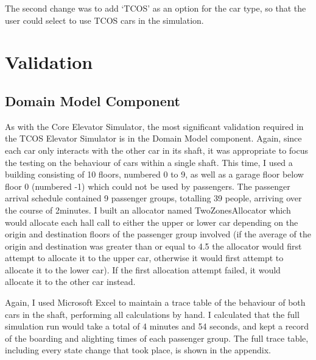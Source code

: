 \documentclass{UoYCSproject}
\begin{document}
The second change was to add `TCOS' as an option for the car type, so that the user could select to use TCOS cars in the simulation.

\section{Validation}

\subsection{Domain Model Component}
As with the Core Elevator Simulator, the most significant validation required in the TCOS Elevator Simulator is in the Domain Model component.  Again, since each car only interacts with the other car in its shaft, it was appropriate to focus the testing on the behaviour of cars within a single shaft.  This time, I used a building consisting of 10 floors, numbered 0 to 9, as well as a garage floor below floor 0 (numbered -1) which could not be used by passengers.  The passenger arrival schedule contained 9 passenger groups, totalling 39 people, arriving over the course of 2\textonehalf minutes.  I built an allocator named TwoZonesAllocator which would allocate each hall call to either the upper or lower car depending on the origin and destination floors of the passenger group involved (if the average of the origin and destination was greater than or equal to 4.5 the allocator would first attempt to allocate it to the upper car, otherwise it would first attempt to allocate it to the lower car).  If the first allocation attempt failed, it would allocate it to the other car instead.

Again, I used Microsoft Excel to maintain a trace table of the behaviour of both cars in the shaft, performing all calculations by hand.  I calculated that the full simulation run would take a total of 4 minutes and 54 seconds, and kept a record of the boarding and alighting times of each passenger group.  The full trace table, including every state change that took place, is shown in the appendix.
\end{document}
